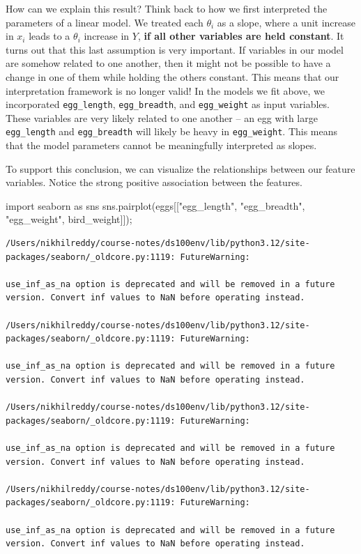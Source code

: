 \documentclass[
  letterpaper,
  DIV=11,
  numbers=noendperiod]{scrreprt}
\newenvironment{Shaded}{\begin{snugshade}}{\end{snugshade}}
\newcommand{\ImportTok}[1]{\textcolor[rgb]{0.00,0.46,0.62}{#1}}
\newcommand{\NormalTok}[1]{\textcolor[rgb]{0.00,0.23,0.31}{#1}}
\newcommand{\OperatorTok}[1]{\textcolor[rgb]{0.37,0.37,0.37}{#1}}
\newcommand{\StringTok}[1]{\textcolor[rgb]{0.13,0.47,0.30}{#1}}
\begin{document}
How can we explain this result? Think back to how we first interpreted
the parameters of a linear model. We treated each \(\theta_i\) as a
slope, where a unit increase in \(x_i\) leads to a \(\theta_i\) increase
in \(Y\), \textbf{if all other variables are held constant}. It turns
out that this last assumption is very important. If variables in our
model are somehow related to one another, then it might not be possible
to have a change in one of them while holding the others constant. This
means that our interpretation framework is no longer valid! In the
models we fit above, we incorporated \texttt{egg\_length},
\texttt{egg\_breadth}, and \texttt{egg\_weight} as input variables.
These variables are very likely related to one another -- an egg with
large \texttt{egg\_length} and \texttt{egg\_breadth} will likely be
heavy in \texttt{egg\_weight}. This means that the model parameters
cannot be meaningfully interpreted as slopes.

To support this conclusion, we can visualize the relationships between
our feature variables. Notice the strong positive association between
the features.

\begin{Shaded}
\begin{Highlighting}[]
\ImportTok{import}\NormalTok{ seaborn }\ImportTok{as}\NormalTok{ sns}
\NormalTok{sns.pairplot(eggs[[}\StringTok{"egg\_length"}\NormalTok{, }\StringTok{"egg\_breadth"}\NormalTok{, }\StringTok{"egg\_weight"}\NormalTok{, }\StringTok{\textquotesingle{}bird\_weight\textquotesingle{}}\NormalTok{]])}\OperatorTok{;}
\end{Highlighting}
\end{Shaded}

\begin{verbatim}
/Users/nikhilreddy/course-notes/ds100env/lib/python3.12/site-packages/seaborn/_oldcore.py:1119: FutureWarning:

use_inf_as_na option is deprecated and will be removed in a future version. Convert inf values to NaN before operating instead.

/Users/nikhilreddy/course-notes/ds100env/lib/python3.12/site-packages/seaborn/_oldcore.py:1119: FutureWarning:

use_inf_as_na option is deprecated and will be removed in a future version. Convert inf values to NaN before operating instead.

/Users/nikhilreddy/course-notes/ds100env/lib/python3.12/site-packages/seaborn/_oldcore.py:1119: FutureWarning:

use_inf_as_na option is deprecated and will be removed in a future version. Convert inf values to NaN before operating instead.

/Users/nikhilreddy/course-notes/ds100env/lib/python3.12/site-packages/seaborn/_oldcore.py:1119: FutureWarning:

use_inf_as_na option is deprecated and will be removed in a future version. Convert inf values to NaN before operating instead.
\end{verbatim}
\end{document}
